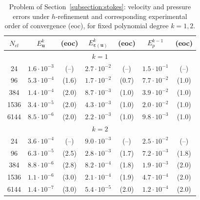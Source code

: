 \documentclass[a4paper,twoside,10pt]{article}
\theoremstyle{plain}
\theoremstyle{remark}
\theoremstyle{definition}
\numberwithin{equation}{section}
\numberwithin{figure}{section}
\newcommand{\ubf}{\mathbf{u}}
\newcommand{\epsbfun}{\underline{\boldsymbol{\varepsilon}}}
\newcommand{\Ekmop}{E_{p}^{k-1}}
\newcommand{\Eku}{E_{\ubf}^{k}}
\newcommand{\Ekepsu}{E_{\epsbfun(\ubf)}^{k}}
\newcommand{\Nel}{N_{el}}
\begin{document}
\begin{table}[htbp]
\centering
\begin{tabular}{c|cc cc cc}
\toprule
$\Nel$
& $\Eku$ & (eoc)
& $\Ekepsu$ & (eoc)
& $\Ekmop$ & (eoc) \\
\midrule
\multicolumn{7}{c}{$k = 1$} \\
24    & $1.6\cdot 10^{-3}$ & (--) & $2.7\cdot 10^{-2}$ & (--) & $1.5\cdot 10^{-1}$ & (--) \\
96    & $5.3\cdot 10^{-4}$ & (1.6) & $1.7\cdot 10^{-2}$ & (0.7) & $7.7\cdot 10^{-2}$ & (1.0) \\
384   & $1.4\cdot 10^{-4}$ & (2.0) & $8.7\cdot 10^{-3}$ & (1.0) & $3.9\cdot 10^{-2}$ & (1.0) \\
1536  & $3.4\cdot 10^{-5}$ & (2.0) & $4.3\cdot 10^{-3}$ & (1.0) & $2.0\cdot 10^{-2}$ & (1.0) \\
6144  & $8.5\cdot 10^{-6}$ & (2.0) & $2.2\cdot 10^{-3}$ & (1.0) & $9.8\cdot 10^{-3}$ & (1.0) \\
\midrule
\multicolumn{7}{c}{$k = 2$} \\
24    & $3.6\cdot 10^{-4}$ & (--) & $9.0\cdot 10^{-3}$ & (--) & $2.5\cdot 10^{-2}$ & (--) \\
96    & $6.3\cdot 10^{-5}$ & (2.5) & $2.8\cdot 10^{-3}$ & (1.7) & $7.2\cdot 10^{-3}$ & (1.8) \\
384   & $8.8\cdot 10^{-6}$ & (2.8) & $8.2\cdot 10^{-4}$ & (1.8) & $1.9\cdot 10^{-3}$ & (2.0) \\
1536  & $1.1\cdot 10^{-6}$ & (3.0) & $2.1\cdot 10^{-4}$ & (1.9) & $4.7\cdot 10^{-4}$ & (2.0) \\
6144  & $1.4\cdot 10^{-7}$ & (3.0) & $5.4\cdot 10^{-5}$ & (2.0) & $1.2\cdot 10^{-4}$ & (2.0) \\
\bottomrule
\end{tabular}
\caption{\footnotesize Problem of Section~\ref{subsection:stokes}:
        velocity and pressure errors under $h$-refinement and
        corresponding experimental order of convergence (eoc),
        for fixed polynomial degree $k=1,2$.}
\label{tab:errors-u-p}
\end{table}
\end{document}

